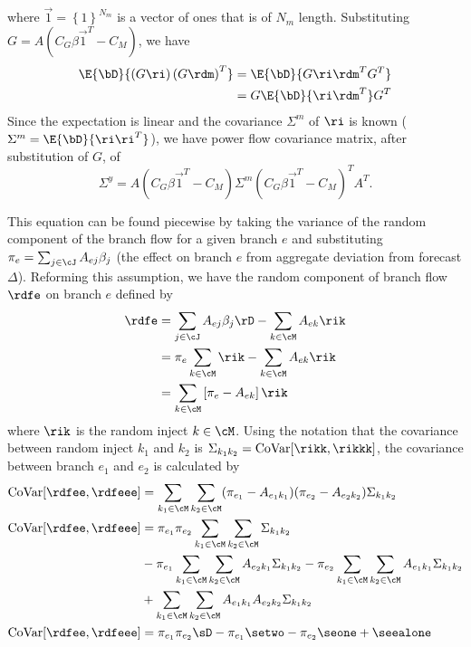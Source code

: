 where $\vec{1} = \left\{ 1 \right\}^{N_m}$ is a vector of ones that is of $N_m$ length.  Substituting $G=A(C_G\beta \vec{1}^T - C_M)$, we have
\begin{align*}
 \E{\bD}{\left( G \ri \right) \left( G \rdm \right)^T } &=  \E{\bD}{ G  \ri \rdm^T G^T } \\
 &= G  \E{\bD}{ \ri \rdm^T } G^T 
\end{align*}
Since the expectation is linear and the covariance $\Sigma^m$ of $\ri$ is known ($\Sigma^m = \E{\bD}{\ri \ri^T}$), we have power flow covariance matrix, after substitution of $G$, of
\begin{equation}\label{branch_cov}
\Sigma^y = A(C_G\beta \vec{1}^T - C_M) \Sigma^m (C_G\beta \vec{1}^T - C_M)^T A^T.
\end{equation}

This equation can be found piecewise by taking the variance of the random component of the branch flow for a given branch $e$ and substituting $\pi_e = \sum_{j \in \cJ} A_{ej} \beta_j$ (the effect on branch $e$ from aggregate deviation from forecast $\Delta$).  Reforming this assumption, we have the random component of branch flow $\rdfe$ on branch $e$ defined by
\begin{align*}
  \rdfe &= \sum_{j \in \cJ} A_{ej} \beta_j \rD - \sum_{k \in \cM} A_{ek} \rik\\
&= \pi_e \sum_{k \in \cM} \rik - \sum_{k \in \cM} A_{ek} \rik\\
&= \sum_{k \in \cM} \left[ \pi_e  - A_{ek} \right] \rik 
\end{align*}
where $\rik$ is the random inject $k \in \cM$. Using the notation that the covariance between random inject $k_1$ and $k_2$ is $\Sigma_{k_1 k_2} = \operatorname{CoVar}[ \rikk ,\rikkk ]$, the covariance between branch $e_1$ and $e_2$ is calculated by
\begin{subequations}\label{covar_branch}
\begin{align}
\operatorname{CoVar}[ \rdfee,\rdfeee ] &=  \sum_{k_1 \in \cM} \sum_{k_2 \in \cM} (\pi_{e_1} - A_{e_1 k_1}) (\pi_{e_2} - A_{e_2 k_2}) \Sigma_{k_1 k_2} \\
\operatorname{CoVar}[ \rdfee,\rdfeee ] &=  \pi_{e_1} \pi_{e_2} \sum_{k_1 \in \cM} \sum_{k_2 \in \cM} \Sigma_{k_1 k_2} \\
& -  \pi_{e_1} \sum_{k_1 \in \cM} \sum_{k_2 \in \cM} A_{e_2 k_1} \Sigma_{k_1 k_2} - \pi_{e_2} \sum_{k_1 \in \cM} \sum_{k_2 \in \cM} A_{e_1 k_1} \Sigma_{k_1 k_2}   \\
&+ \sum_{k_1 \in \cM} \sum_{k_2 \in \cM} A_{e_1 k_1} A_{e_2 k_2} \Sigma_{k_1 k_2}  \\
\operatorname{CoVar}[ \rdfee,\rdfeee ] &=  \pi_{e_1} \pi_{e_2} \sD -  \pi_{e_1} \setwo - \pi_{e_2} \seone   + \seealone
\end{align}
\end{subequations}
